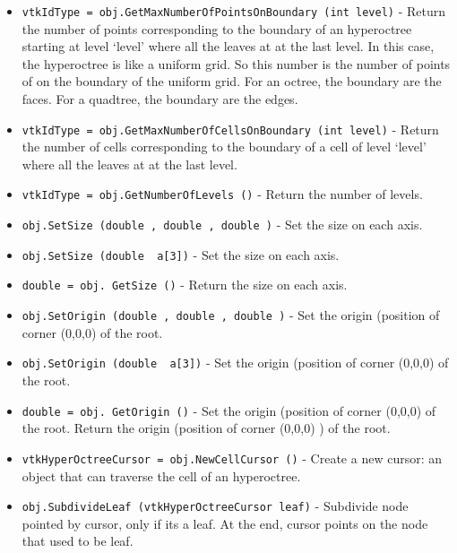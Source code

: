 \begin{itemize}
 

\item  \verb|vtkIdType = obj.GetMaxNumberOfPointsOnBoundary (int level)| -  Return the number of points corresponding to the boundary of an
 hyperoctree starting at level `level' where all the leaves at at the last
 level. In this case, the hyperoctree is like a uniform grid. So this
 number is the number of points of on the boundary of the uniform grid.
 For an octree, the boundary are the faces. For a quadtree, the boundary
 are the edges.
 
 
 
 

\item  \verb|vtkIdType = obj.GetMaxNumberOfCellsOnBoundary (int level)| -  Return the number of cells corresponding to the boundary of a cell
 of level `level' where all the leaves at at the last level. 
 
 

\item  \verb|vtkIdType = obj.GetNumberOfLevels ()| -  Return the number of levels.
 

\item  \verb|obj.SetSize (double , double , double )| -  Set the size on each axis.

\item  \verb|obj.SetSize (double  a[3])| -  Set the size on each axis.

\item  \verb|double = obj. GetSize ()| -  Return the size on each axis.

\item  \verb|obj.SetOrigin (double , double , double )| -  Set the origin (position of corner (0,0,0) of the root.

\item  \verb|obj.SetOrigin (double  a[3])| -  Set the origin (position of corner (0,0,0) of the root.

\item  \verb|double = obj. GetOrigin ()| -  Set the origin (position of corner (0,0,0) of the root.
 Return the origin (position of corner (0,0,0) ) of the root.

\item  \verb|vtkHyperOctreeCursor = obj.NewCellCursor ()| -  Create a new cursor: an object that can traverse
 the cell of an hyperoctree.
 

\item  \verb|obj.SubdivideLeaf (vtkHyperOctreeCursor leaf)| -  Subdivide node pointed by cursor, only if its a leaf.
 At the end, cursor points on the node that used to be leaf.
 

\end{itemize}
